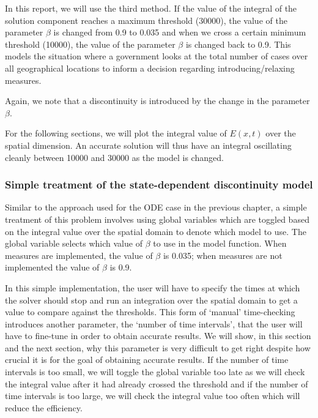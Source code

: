 \documentclass{article}
\begin{document}
In this report, we will use the third method. If the value of the integral of the solution component reaches a maximum threshold (30000), the value of the parameter $\beta$ is changed from 0.9 to 0.035 and when we cross a certain minimum threshold (10000), the value of the parameter $\beta$ is changed back to 0.9. This models the situation where a government looks at the total number of cases over all geographical locations to inform a decision regarding introducing/relaxing measures.

Again, we note that a discontinuity is introduced by the change in the parameter $\beta$.

For the following sections, we will plot the integral value of $E(x, t)$ over the spatial dimension. An accurate solution will thus have an integral oscillating cleanly between 10000 and 30000 as the model is changed.

\subsubsection{Simple treatment of the state-dependent discontinuity model}
\label{subsubsection:pde_state_naive}
Similar to the approach used for the ODE case in the previous chapter, a simple treatment of this problem involves using global variables which are toggled based on the integral value over the spatial domain to denote which model to use. The global variable selects which value of $\beta$ to use in the model function. When measures are implemented, the value of $\beta$ is 0.035; when measures are not implemented the value of $\beta$ is 0.9.

In this simple implementation, the user will have to specify the times at which the solver should stop and run an integration over the spatial domain to get a value to compare against the thresholds. This form of `manual' time-checking introduces another parameter, the `number of time intervals', that the user will have to fine-tune in order to obtain accurate results. We will show, in this section and the next section, why this parameter is very difficult to get right despite how crucial it is for the goal of obtaining accurate results. If the number of time intervals is too small, we will toggle the global variable too late as we will check the integral value after it had already crossed the threshold and if the number of time intervals is too large, we will check the integral value too often which will reduce the efficiency. 
\end{document}
